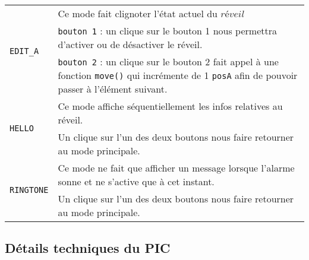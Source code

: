 \documentclass{article}
\begin{document}
\begin{tabular}{|p{2cm}|p{13cm}|}
		\hline
		\multirow{3}{*}{\texttt{EDIT\_A}} & Ce mode fait clignoter l'état actuel du $réveil$\\
														& \texttt{bouton 1} : un clique sur le bouton 1 nous permettra d'activer ou de désactiver le réveil.\\
														& \texttt{bouton 2} : un clique sur le bouton 2 fait appel à une fonction \texttt{move()} qui incrémente de 1 \texttt{posA} afin de pouvoir passer à l'élément suivant.\\ 
		\hline
		\multirow{2}{*}{\texttt{HELLO}} & Ce mode affiche séquentiellement les infos relatives au réveil.  \\
													   & Un clique sur l'un des deux boutons nous faire retourner au mode principale.\\
		\hline
		\multirow{2}{*}{\texttt{RINGTONE}} & Ce mode ne fait que afficher un message lorsque l'alarme sonne et ne s'active que à cet instant. \\
															 & Un clique sur l'un des deux boutons nous faire retourner au mode principale.\\
		\hline
		\end{tabular}
		
		 
		\subsection{Détails techniques du PIC}
\end{document}
